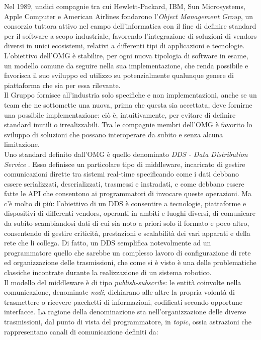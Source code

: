 \indent Nel 1989, undici compagnie tra cui Hewlett-Packard, IBM, Sun Microsystems, Apple Computer e American Airlines fondarono l’\emph{Object Management Group}, un consorzio tuttora attivo nel campo dell’informatica con il fine di definire standard per il software a scopo industriale, favorendo l’integrazione di soluzioni di vendors diversi in unici ecosistemi, relativi a differenti tipi di applicazioni e tecnologie. L’obiettivo dell'OMG è stabilire, per ogni nuova tipologia di software in esame, un modello comune da seguire nella sua implementazione, che renda possibile e favorisca il suo sviluppo ed utilizzo su potenzialmente qualunque genere di piattaforma che sia per essa rilevante.\\
Il Gruppo fornisce all’industria solo specifiche e non implementazioni, anche se un team che ne sottomette una nuova, prima che questa sia accettata, deve fornirne una possibile implementazione: ciò è, intuitivamente, per evitare di definire standard inutili o irrealizzabili. Tra le compagnie membri dell’OMG è favorito lo sviluppo di soluzioni che possano interoperare da subito e senza alcuna limitazione.\\
Uno standard definito dall’OMG è quello denominato \emph{DDS - Data Distribution Service} \cite{dds}. Esso definisce un particolare tipo di middleware, incaricato di gestire comunicazioni dirette tra sistemi real-time specificando come i dati debbano essere serializzati, deserializzati, trasmessi e instradati, e come debbano essere fatte le API che consentono ai programmatori di invocare queste operazioni. Ma c’è molto di più: l’obiettivo di un DDS è consentire a tecnologie, piattaforme e dispositivi di differenti vendors, operanti in ambiti e luoghi diversi, di comunicare da subito scambiandosi dati di cui sia noto a priori solo il formato e poco altro, consentendo di gestire criticità, prestazioni e scalabilità dei vari apparati e della rete che li collega. Di fatto, un DDS semplifica notevolmente ad un programmatore quello che sarebbe un complesso lavoro di configurazione di rete ed organizzazione delle trasmissioni, che come si è visto è una delle problematiche classiche incontrate durante la realizzazione di un sistema robotico.\\
Il modello del middleware è di tipo \emph{publish-subscribe}: le entità coinvolte nella comunicazione, denominate \emph{nodi}, dichiarano alle altre la propria volontà di trasmettere o ricevere pacchetti di informazioni, codificati secondo opportune interfacce. La ragione della denominazione sta nell'organizzazione delle diverse trasmissioni, dal punto di vista del programmatore, in \emph{topic}, ossia astrazioni che rappresentano canali di comunicazione definiti da:
